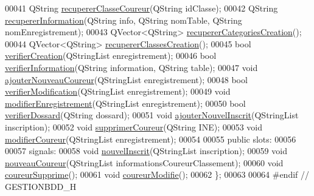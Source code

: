 \begin{DoxyCode}
00041     QString \hyperlink{class_gestion_b_d_d_a0e90b16b2e330de9cc80f72f0d648e5d}{recupererClasseCoureur}(QString idClasse);
00042     QString \hyperlink{class_gestion_b_d_d_a0a2fa02b90974684658937fbfb55bf0a}{recupererInformation}(QString info, QString nomTable, QString 
      nomEnregistrement);
00043     QVector<QString> \hyperlink{class_gestion_b_d_d_a76ab3e307ad9005dcdb2781fc77fc5c8}{recupererCategoriesCreation}();
00044     QVector<QString> \hyperlink{class_gestion_b_d_d_a38d728d644f23048f1a6d3e6d4656764}{recupererClassesCreation}();
00045     \textcolor{keywordtype}{bool} \hyperlink{class_gestion_b_d_d_af6a83eb058d71d9c583c403bf5a8ce3b}{verifierCreation}(QStringList enregistrement);
00046     \textcolor{keywordtype}{bool} \hyperlink{class_gestion_b_d_d_abfd3cfb9553a83aafd86c3149869d6c0}{verifierInformation}(QString information, QString table);
00047     \textcolor{keywordtype}{void} \hyperlink{class_gestion_b_d_d_ae71561eea6d1163ff067f079ccc6d169}{ajouterNouveauCoureur}(QStringList enregistrement);
00048     \textcolor{keywordtype}{bool} \hyperlink{class_gestion_b_d_d_a5ea332563e5be2116084ed2886c355c8}{verifierModification}(QStringList enregistrement);
00049     \textcolor{keywordtype}{void} \hyperlink{class_gestion_b_d_d_af64457de89c484bf854db0910bef790e}{modifierEnregistrement}(QStringList enregistrement);
00050     \textcolor{keywordtype}{bool} \hyperlink{class_gestion_b_d_d_a1a39bbc7bfcb60d286363b9d2dd7f88b}{verifierDossard}(QString dossard);
00051     \textcolor{keywordtype}{void} \hyperlink{class_gestion_b_d_d_a71391d5419969b52cd999463b5326599}{ajouterNouvelInscrit}(QStringList inscription);
00052     \textcolor{keywordtype}{void} \hyperlink{class_gestion_b_d_d_afe47ec92274b7998131c5d4e6551d177}{supprimerCoureur}(QString INE);
00053     \textcolor{keywordtype}{void} \hyperlink{class_gestion_b_d_d_afad096d7e405d35a818d4858ee34df61}{modifierCoureur}(QStringList enregistrement);
00054 
00055 \textcolor{keyword}{public} slots:
00056 
00057 signals:
00058     \textcolor{keywordtype}{void} \hyperlink{class_gestion_b_d_d_a61bc349c8942a196e2edd3083465286f}{nouvelInscrit}(QStringList inscription);
00059     \textcolor{keywordtype}{void} \hyperlink{class_gestion_b_d_d_acf915265e83f03b500f10ffbde2680bb}{nouveauCoureur}(QStringList informationsCoureurClassement);
00060     \textcolor{keywordtype}{void} \hyperlink{class_gestion_b_d_d_aabb5dfcdcec4ef37477fff65f6624784}{coureurSupprime}();
00061     \textcolor{keywordtype}{void} \hyperlink{class_gestion_b_d_d_a911c1e7a4d8bc38566512db37b13c9f0}{coureurModifie}();
00062 \};
00063 
00064 \textcolor{preprocessor}{#endif // GESTIONBDD\_H}
\end{DoxyCode}
